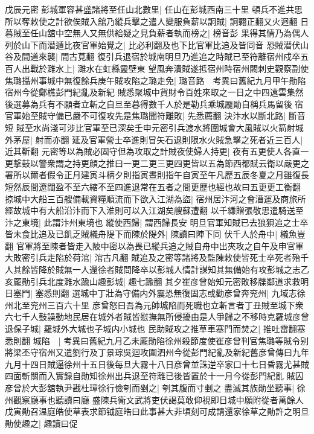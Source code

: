 戊辰元密彭城軍容甚盛諸將至任山北數里|{
	任山在彭城西南三十里}
頓兵不進共思所以奪敕使之計欲俟賊入舘乃縱兵擊之遣人變服負薪以詗賊|{
	詗翾正翻又火迥翻}
日暮賊至任山舘中空無人又無供給疑之見負薪者執而榜之|{
	榜音彭}
果得其情乃為偶人列於山下而潜遁比夜官軍始覺之|{
	比必利翻及也下比官軍比追及皆同音}
恐賊潜伏山谷及間道來襲|{
	間古莧翻}
復引兵退宿於城南明旦乃進追之時賊已至符離宿州戍卒五百人出戰於濉水上|{
	濉水在虹縣靈壁東}
望風奔潰賊遂抵宿州時宿州闕刺史觀察副使焦璐攝州事城中無復餘兵庚午賊攻陷之璐走免|{
	璐音路　考異曰舊紀九月甲午勛陷宿州今從鄭樵彭門紀亂及新紀}
賊悉聚城中貨財令百姓來取之一日之中四遠雲集然後選募為兵有不願者立斬之自旦至暮得數千人於是勒兵乘城龎勛自稱兵馬留後宿官軍始至賊守備已嚴不可復攻先是焦璐聞符離敗|{
	先悉薦翻}
決汴水以斷北路|{
	斷音短}
賊至水尚淺可涉比官軍至已深矣壬申元密引兵渡水將圍城會大風賊以火箭射城外茅屋|{
	射而亦翻}
延及官軍營士卒進則冒矢石退則限水火賊急擊之死者近三百人|{
	近其靳翻}
元密等以為賊必固守但為攻取之計賊夜使婦人持更|{
	夜有五更使人各直一更撃鼓以警衆謂之持更顔之推曰一更二更三更四更皆以五為節西都賦云衛以嚴更之署所以爾者假令正月建寅斗柄夕則指寅晝則指午自寅至午凡歷五辰冬夏之月雖復長短然辰間遼闊盈不至六縮不至四進退常在五者之間更歷也經也故曰五更更工衡翻}
掠城中大船三百艘備載資糧順流而下欲入江湖為盜|{
	宿州居汴河之會漕運及商旅所經故城中有大船沿汴而下入淮則可以入江湖矣艘蘇遭翻}
以千縑贈張敬思遣騎送至汴之東境|{
	此謂汴州東境也}
縱使西歸|{
	謂西歸長安}
明旦官軍知賊已去狼狽追之士卒皆未食比追及已飢乏賊檥舟隄下而陳於隄外|{
	陳讀曰陣下同}
伏千人於舟中|{
	檥魚豈翻}
官軍將至陳者皆走入陂中密以為畏已縱兵追之賊自舟中出夾攻之自午及申官軍大敗密引兵走陷於荷涫|{
	涫古凡翻}
賊追及之密等諸將及監陳敕使皆死士卒死者殆千人其餘皆降於賊無一人還徐者賊問降卒以彭城人情計謀知其無備始有攻彭城之志乙亥龎勛引兵北度濉水踰山趣彭城|{
	趣七踰翻}
其夕崔彦曾始知元密敗移牒鄰道求救明日塞門|{
	塞悉則翻}
選城中丁壯為守備内外震恐無復固志或勸彦曾奔兖州|{
	九域志徐州北至兖州三百六十里}
彦曾怒曰吾為元帥城陷而死職也立斬言者丁丑賊至城下衆六七千人鼓譟動地民居在城外者賊皆慰撫無所侵擾由是人爭歸之不移時克羅城彦曾退保子城|{
	羅城外大城也子城内小城也}
民助賊攻之推草車塞門而焚之|{
	推吐雷翻塞悉則翻}
城陷　|{
	考異曰舊紀九月乙未龎勛陷徐州殺節度使崔彦曾判官焦璐等賊令别將梁丕守宿州又遣劉行及丁景琮吳迴攻圍泗州今從彭門紀亂及新紀舊彦曾傳曰九年九月十四日賊逼徐州十五日後每旦大霧十八日彦曾並誅逆卒家口十七日昏霧尤甚賊四面斬關而入實録自勛知徐州出兵退至符離已後皆置於十一月今從彭門紀亂}
賊囚彦曾於大彭舘執尹戡杜璋徐行儉刳而剉之|{
	刳其腹而寸剉之}
盡滅其族勛坐聽事|{
	徐州觀察廳事也聽讀曰廳}
盛陳兵衛文武將吏伏謁莫敢仰視即日城中願附從者萬餘人戊寅勛召温庭皓使草表求節钺庭皓曰此事甚大非頃刻可成請還家徐草之勛許之明旦勛使趣之|{
	趣讀曰促}
